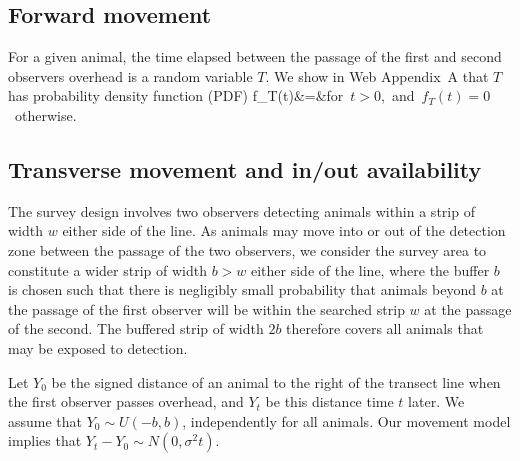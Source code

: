 \documentclass[useAMS, usenatbib, referee]{biom}\usepackage[]{graphicx}\usepackage[]{color}
\begin{document}
\subsection{Forward movement}

For a given animal, the time elapsed between the passage of the first and second observers overhead is a random variable $T$. We show in Web Appendix~A that $T$ has probability density function (PDF)
\be
f_{T}(t)&=&\;\;\mbox{for $t>0$, and $f_{T}(t)=0$ otherwise.}
\label{eq:fTt}
\ee
\noindent





\subsection{Transverse movement and in/out availability}


The survey design involves two observers detecting animals within a strip of width $w$ either side of the line. As animals may move into or out of the detection zone between the passage of the two observers, we consider the survey area to constitute a wider strip of width $b>w$ either side of the line, where the buffer $b$ is chosen such that there is negligibly small probability that animals beyond $b$ at the passage of the first observer will be within the searched strip $w$ at the passage of the second. The buffered strip of width $2b$ therefore covers all animals that may be exposed to detection.

Let $Y_0$ be the signed distance of an animal to the right of the transect line when the first observer passes overhead, and $Y_t$ be this distance time $t$ later. We assume that $Y_0\sim U(-b,b)$, independently for all animals. Our movement model implies that $Y_t-Y_0\sim N(0,\sigma^2t)$.
\end{document}
